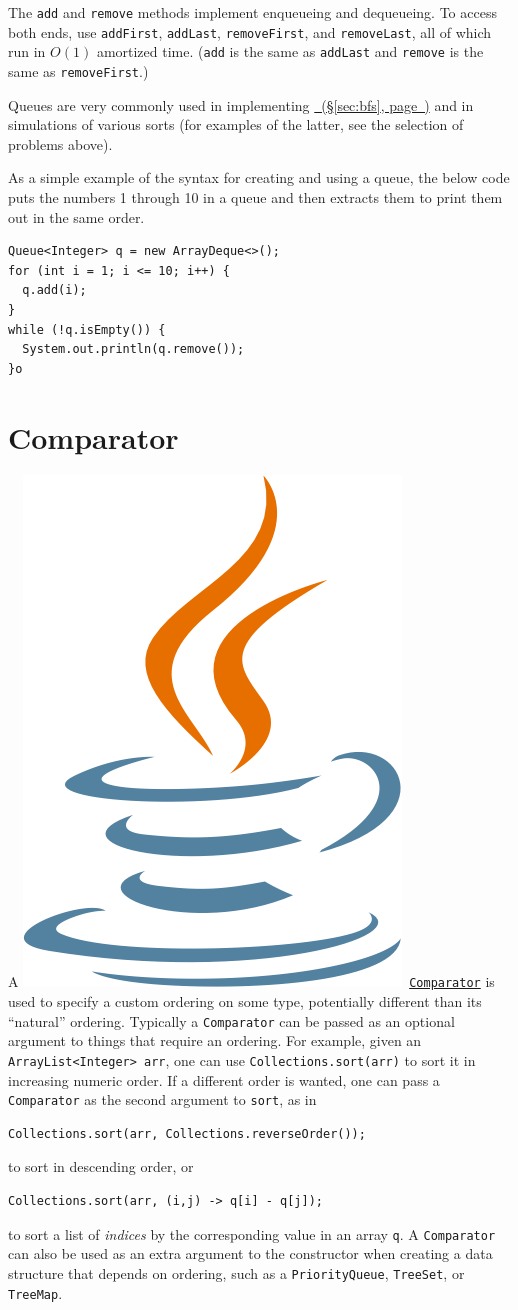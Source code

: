 \documentclass[10pt]{book}
\newcommand*{\fulllink}[1]{\hyperref[{#1}]{\nameref*{#1}~(\S\ref*{#1}, page~\pageref*{#1})}}
\newcommand{\javalogo}{\includegraphics[height=0.9\baselineskip]{Java}}
\newcommand*{\javadoclink}[2]{\href{https://docs.oracle.com/javase/10/docs/api/java/#1/#2.html}{\texttt{#2}}}
\newcommand*{\javadoc}[2]{\javalogo\ \javadoclink{#1}{#2}}
\newif\iftodos
\newcommand{\todo}[1]{\iftodos\textcolor{red}{[TODO: #1]}\fi}
\begin{document}
The \texttt{add} and \texttt{remove} methods implement enqueueing and
dequeueing.  To access both ends, use \texttt{addFirst},
\texttt{addLast}, \texttt{removeFirst}, and \texttt{removeLast}, all
of which run in $O(1)$ amortized time. (\texttt{add} is the same as
\texttt{addLast} and \texttt{remove} is the same as
\texttt{removeFirst}.)

Queues are very commonly used in implementing \fulllink{sec:bfs} and
in simulations of various sorts (for examples of the latter, see the
selection of problems above).

As a simple example of the syntax for creating and using a queue, the
below code puts the numbers 1 through 10 in a queue and then extracts
them to print them out in the same order.
\begin{verbatim}
Queue<Integer> q = new ArrayDeque<>();
for (int i = 1; i <= 10; i++) {
  q.add(i);
}
while (!q.isEmpty()) {
  System.out.println(q.remove());
}o
\end{verbatim}

\section{Comparator}
\label{sec:comparator}

A \javadoc{util}{Comparator} is used to specify a custom ordering on
some type, potentially different than its ``natural'' ordering.
Typically a \texttt{Comparator} can be passed as an optional argument
to things that require an ordering.  For example, given an
\texttt{ArrayList<Integer> arr}, one can use
\texttt{Collections.sort(arr)} to sort it in increasing numeric order.
If a different order is wanted, one can pass a \texttt{Comparator} as
the second argument to \texttt{sort}, as in
\begin{verbatim}
Collections.sort(arr, Collections.reverseOrder());
\end{verbatim}
to sort in descending order, or
\begin{verbatim}
Collections.sort(arr, (i,j) -> q[i] - q[j]);
\end{verbatim}
to sort a list of \emph{indices} by the corresponding value in an
array \texttt{q}.  A \texttt{Comparator} can also be used as an extra
argument to the constructor when creating a data structure that
depends on ordering, such as a \texttt{PriorityQueue},
\texttt{TreeSet}, or \texttt{TreeMap}.

\todo{Constructing Comparators via lambda; constructing via things
  like \texttt{comparing}, \texttt{thenComparing}.
  \texttt{Collections.reverseOrder()}.}
\end{document}
